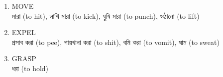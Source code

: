 \documentclass[11pt,a4paper,twocolumn]{article}
\begin{document}
{\begin{enumerate}
		\item MOVE\\
		\textcolor{hlit}{মারা} (to hit), \textcolor{hlit}{লাথি মারা} (to kick), 
		\textcolor{hlit}{ঘুষি মারা} (to punch), \textcolor{hlit}{ওঠানো} (to lift)\\
		
		\item EXPEL\\
		\textcolor{hlit}{প্রসাব করা} (to pee), \textcolor{hlit}{পায়খানা করা} (to shit), 
		\textcolor{hlit}{বমি করা} (to vomit), \textcolor{hlit}{ঘাম} (to sweat)\\
		
		\item GRASP\\
		\textcolor{hlit}{ধরা} (to hold)\\
			
	
	\end{enumerate}
	
	}
\end{document}
